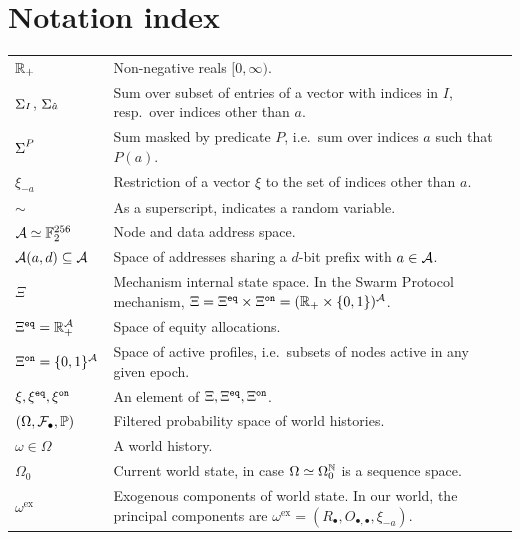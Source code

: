 \newpage
\appendix
\section{Notation index}


\renewcommand{\arraystretch}{1.5}
\begin{tabularx}{\textwidth}{lX}

  $\mathbb{R}_+$ & Non-negative reals $[0,\infty)$. \\
  $\mathop{\Sigma}_I$, $\mathop{\Sigma}_{\hat{a}}$     & Sum over subset of entries of a vector with indices in $I$, resp.~over indices other than $a$. \\
  $\mathop{\Sigma}^P$   & Sum masked by predicate $P$, i.e.~sum over indices $a$ such that $P(a)$. \\
  $\xi_{-a}$ & Restriction of a vector $\xi$ to the set of indices other than $a$. \\
  $\sim$ & As a superscript, indicates a random variable. \\
  $\mathcal{A}\simeq\mathbb{F}_2^{256}$ & Node and data address space. \\
  $\mathcal{A}(a,d)\subseteq\mathcal{A}$ & Space of addresses sharing a $d$-bit prefix with $a\in\mathcal{A}$. \\
  $\Xi$& Mechanism internal state space.   
  In the Swarm Protocol mechanism, $\Xi=\Xi^{\mathtt{eq}}\times\Xi^{\mathtt{on}}=(\mathbb{R}_+\times\{0,1\})^{\mathcal{A}}$. \\
  $\Xi^{\mathtt{eq}}=\mathbb{R}_+^{\mathcal{A}}$ & Space of equity allocations. \\
  $\Xi^{\mathtt{on}} = \{0,1\}^{\mathcal{A}}$ & Space of active profiles, i.e.~subsets of nodes active in any given epoch. \\
  $\xi,\xi^{\mathtt{eq}},\xi^{\mathtt{on}}$ & An element of $\Xi,\Xi^{\mathtt{eq}},\Xi^{\mathtt{on}}$. \\
  $(\Omega,\mathcal{F}_\bullet,\mathbb{P})$ & Filtered probability space of world histories. \\
  $\omega\in\Omega$ & A world history. \\
  $\Omega_0$ & Current world state, in case $\Omega\simeq \Omega_0^{\mathbb{N}}$ is a sequence space. \\
  $\omega^\mathrm{ex}$ & Exogenous components of world state. In our world, the principal components are $\omega^\mathrm{ex}=(R_\bullet,O_{\bullet,\bullet},\xi_{-a})$. \\

\end{tabularx}
